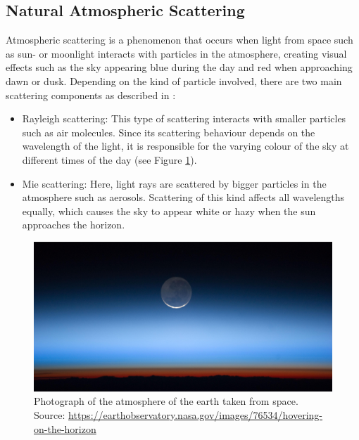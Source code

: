 \documentclass[12pt]{article}
\begin{document}
\subsection{Natural Atmospheric Scattering}
Atmospheric scattering is a phenomenon that occurs when light from space such as sun- or moonlight interacts with particles in the atmosphere, creating visual effects such as the sky appearing blue during the day and red when approaching dawn or dusk.
Depending on the kind of particle involved, there are two main scattering components as described in \cite{bruneton_precomputed_2008}:
\begin{itemize}
    \item Rayleigh scattering: This type of scattering interacts with smaller particles such as air molecules.
    Since its scattering behaviour depends on the wavelength of the light, it is responsible for the varying colour of the sky at different times of the day (see Figure \ref{fig:atmospheric_scattering}).
    \item Mie scattering: Here, light rays are scattered by bigger particles in the atmosphere such as aerosols.
    Scattering of this kind affects all wavelengths equally, which causes the sky to appear white or hazy when the sun approaches the horizon.
\end{itemize}
\begin{figure}[h!]
    \centering
    \includegraphics[width=1.0\textwidth]{./figures/atmos.jpg}
    \caption{Photograph of the atmosphere of the earth taken from space.
    \\Source: \url{https://earthobservatory.nasa.gov/images/76534/hovering-on-the-horizon}}
    \label{fig:atmospheric_scattering}
\end{figure}
\end{document}
